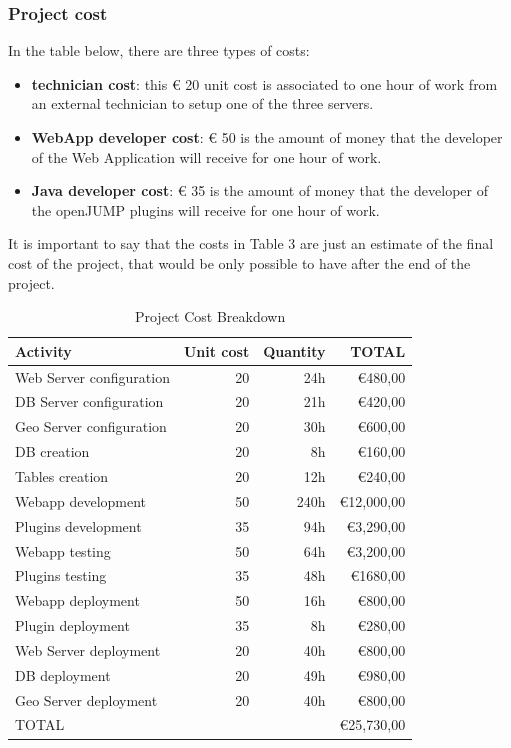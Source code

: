 \subsubsection{Project cost}
In the table below, there are three types of costs:
\begin{itemize}
    \item \textbf{technician cost}: this € 20  unit cost is associated to one hour of work from an external technician to setup one of the three servers.
    \item \textbf{WebApp developer cost}: € 50 is the amount of money that the developer of the Web Application will receive for one hour of work.
    \item \textbf{Java developer cost}: € 35 is the amount of money that the developer of the openJUMP plugins will receive for one hour of work. 
\end{itemize}
It is important to say that the costs in Table 3 are just an estimate of the final cost of the project, that would be only possible to have after the end of the project.
\begin{table}[htbp]
    \centering
    \label{cost}
    \caption{Project Cost Breakdown} 
    \begin{tabular}{lrrr}
        \toprule
        Activity & Unit cost & Quantity & TOTAL \\
        \midrule
        Web Server configuration & 20 & 24h & €480,00 \\
        DB Server configuration & 20 & 21h & €420,00 \\
        Geo Server configuration & 20 & 30h & €600,00 \\
        DB creation & 20 & 8h & €160,00 \\
        Tables creation & 20 & 12h & €240,00 \\
        Webapp development & 50 & 240h & €12,000,00 \\
        Plugins development & 35 & 94h & €3,290,00 \\
        Webapp testing & 50 & 64h & €3,200,00 \\
        Plugins testing & 35 & 48h & €1680,00 \\
        Webapp deployment & 50 & 16h & €800,00 \\
        Plugin deployment & 35 & 8h & €280,00 \\
        Web Server deployment & 20 & 40h & €800,00 \\
        DB deployment & 20 & 49h & €980,00 \\
        Geo Server deployment & 20 & 40h & €800,00 \\
        \midrule
        TOTAL & & & €25,730,00 \\
        \bottomrule
    \end{tabular}
\end{table}

